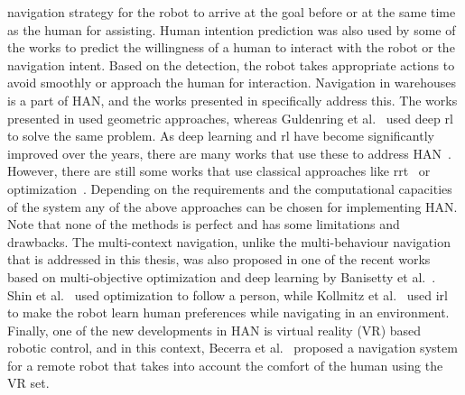 navigation strategy for the robot to arrive at the goal before or at the same time as the human for assisting. Human intention prediction was also used by some of the works \cite{ratsamee2013social, peddi2020data, park2016hi} to predict the willingness of a human to interact with the robot or the navigation intent. Based on the detection, the robot takes appropriate actions to avoid smoothly or approach the human for interaction. Navigation in warehouses is a part of HAN, and the works presented in \cite{fernandez2019making, dondrup2016qualitative, kenk2019human, guldenring2020learning} specifically address this. The works presented in \cite{fernandez2019making, kenk2019human} used geometric approaches, whereas Guldenring et al.~\cite{guldenring2020learning} used deep \acrshort{rl} to solve the same problem. As deep learning and \acrshort{rl} have become significantly improved over the years, there are many works that use these to address HAN~\cite{qiu2022learning, perez2018learning, fahad2020learning}. However, there are still some works that use classical approaches like \acrshort{rrt}~\cite{majd2021safe} or optimization~\cite{shin2020optimization, banisetty2018towards}. Depending on the requirements and the computational capacities of the system any of the above approaches can be chosen for implementing HAN. Note that none of the methods is perfect and has some limitations and drawbacks. The multi-context navigation, unlike the multi-behaviour navigation that is addressed in this thesis, was also proposed in one of the recent works based on multi-objective optimization and deep learning by Banisetty et al.~\cite{banisetty2020deep}. Shin et al.~\cite{shin2020optimization} used optimization to follow a person, while Kollmitz et al.~\cite{kollmitz2020learning} used \acrshort{irl} to make the robot learn human preferences while navigating in an environment. Finally, one of the new developments in HAN is virtual reality (VR) based robotic control, and in this context, Becerra et al.~\cite{becerra2020human} proposed a navigation system for a remote robot that takes into account the comfort of the human using the VR set. 

